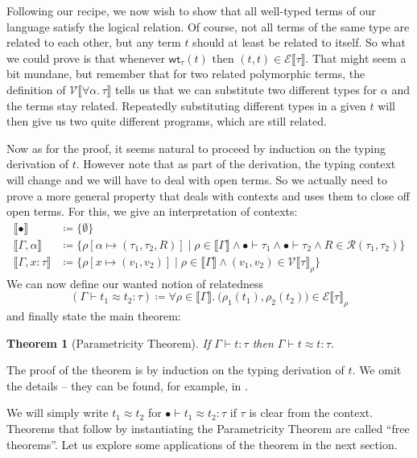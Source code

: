 \documentclass[12pt]{article}
\theoremstyle{plain}
\newtheorem{thm}[equation]{Theorem}
\theoremstyle{definition}
\newcommand{\denot}[1]{\llbracket#1\rrbracket}
\newcommand{\vint}[1]{\mathcal{V}\denot{#1}}
\newcommand{\tint}[1]{\mathcal{E}\denot{#1}}
\newcommand{\wt}[1]{\mathsf{wt}_{#1}}
\newcommand{\rels}{\mathcal{R}}
\begin{document}
Following our recipe, we now wish to show that all well-typed terms of our language satisfy the logical relation.
Of course, not all terms of the same type are related to each other,
but any term $t$ should at least be related to itself.
So what we could prove is that whenever $\wt{\tau}(t)$ then $(t,t)\in\tint{\tau}$.
That might seem a bit mundane, but remember that for two related polymorphic terms,
the definition of $\vint{\forall \alpha.\, \tau}$ tells us that
we can substitute two different types for $\alpha$ and the terms stay related.
Repeatedly substituting different types in a given $t$ will then give us two
quite different programs, which are still related.

Now as for the proof, it seems natural to proceed by induction on the typing derivation of $t$.
However note that as part of the derivation, the typing context will change and we will have to deal with open terms.
So we actually need to prove a more general property that deals with contexts and uses them to close off open terms.
For this, we give an interpretation of contexts:
\begin{align*}
  \denot{\bullet}&\coloneqq \{\emptyset\} \\
  \denot{\Gamma, \alpha}&\coloneqq \bigl\{\rho[\alpha\mapsto(\tau_1,\tau_2,R)]\mid \rho\in\denot{\Gamma}\land \bullet\vdash \tau_1\land \bullet\vdash \tau_2\land R\in\rels(\tau_1,\tau_2)\bigr\} \\
  \denot{\Gamma, x : \tau}&\coloneqq \bigl\{\rho[x\mapsto(v_1,v_2)]\mid \rho\in\denot{\Gamma}\land (v_1,v_2)\in\vint{\tau}_\rho\bigr\}
\end{align*}
We can now define our wanted notion of relatedness
\begin{equation*}
  (\Gamma \vdash t_1\approx t_2 : \tau) \coloneqq\forall\rho\in\denot{\Gamma}.\ \bigl(\rho_1(t_1),\rho_2(t_2)\bigr)\in\tint{\tau}_\rho
\end{equation*}
and finally state the main theorem:
\begin{thm}[Parametricity Theorem]\label{thm:fundprop}
  If $\Gamma\vdash t : \tau$ then
  $\Gamma \vdash t\approx t : \tau$.
\end{thm}
The proof of the theorem is by induction on the typing derivation of $t$.
We omit the details -- they can be found, for example, in \citep{skorstengaard2019introduction}.

We will simply write $t_1\approx t_2$ for $\bullet \vdash t_1\approx t_2 : \tau$ if $\tau$ is clear from the context.
Theorems that follow by instantiating the Parametricity Theorem are called ``free theorems''.
Let us explore some applications of the theorem in the next section.
\end{document}

